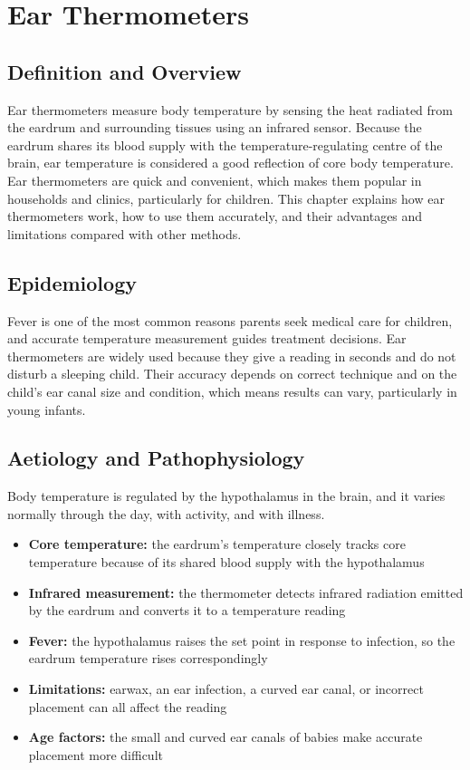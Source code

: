 \chapter{Ear Thermometers}

\section*{Definition and Overview}
Ear thermometers measure body temperature by sensing the heat radiated from the eardrum and surrounding tissues using an infrared sensor. Because the eardrum shares its blood supply with the temperature-regulating centre of the brain, ear temperature is considered a good reflection of core body temperature. Ear thermometers are quick and convenient, which makes them popular in households and clinics, particularly for children. This chapter explains how ear thermometers work, how to use them accurately, and their advantages and limitations compared with other methods.

\section*{Epidemiology}
Fever is one of the most common reasons parents seek medical care for children, and accurate temperature measurement guides treatment decisions. Ear thermometers are widely used because they give a reading in seconds and do not disturb a sleeping child. Their accuracy depends on correct technique and on the child's ear canal size and condition, which means results can vary, particularly in young infants.

\section*{Aetiology and Pathophysiology}
Body temperature is regulated by the hypothalamus in the brain, and it varies normally through the day, with activity, and with illness.
\begin{itemize}
    \item \textbf{Core temperature:} the eardrum's temperature closely tracks core temperature because of its shared blood supply with the hypothalamus
    \item \textbf{Infrared measurement:} the thermometer detects infrared radiation emitted by the eardrum and converts it to a temperature reading
    \item \textbf{Fever:} the hypothalamus raises the set point in response to infection, so the eardrum temperature rises correspondingly
    \item \textbf{Limitations:} earwax, an ear infection, a curved ear canal, or incorrect placement can all affect the reading
    \item \textbf{Age factors:} the small and curved ear canals of babies make accurate placement more difficult
\end{itemize}

